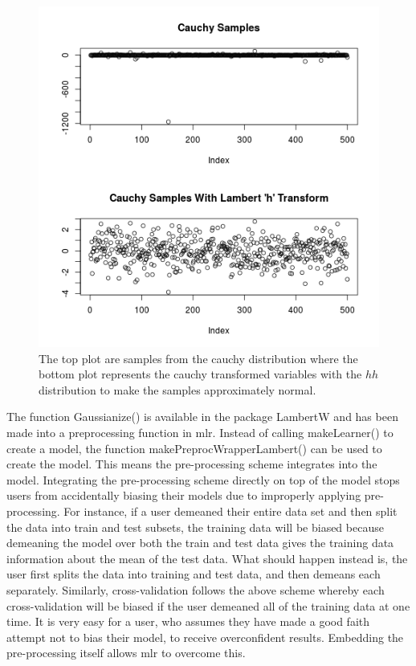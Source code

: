 \documentclass[12pt]{article}\usepackage[]{graphicx}\usepackage[]{color}
\makeatletter
\theoremstyle{definition}
\newcommand\code{\@codex}
\def\@codex#1{{\normalfont\ttfamily\hyphenchar\font=-1 #1}}
\newcommand{\pkg}[1]{{\fontseries{b}\selectfont #1}}
\makeatother
\begin{document}
\begin{figure}[H]
\includegraphics[width=\linewidth]{cauchy_h_train.png}
\centering
\caption{The top plot are samples from the cauchy distribution where the bottom plot represents the cauchy transformed variables with the $hh$ distribution to make the samples approximately normal.}
\label{fig:cauchy_lambert}
\end{figure}

\doublespacing

The function \code{Gaussianize()} is available in the package \pkg{LambertW} and has been made into a preprocessing function in \pkg{mlr}. Instead of calling \code{makeLearner()} to create a model, the function \code{makePreprocWrapperLambert()} can be used to create the model. This means the pre-processing scheme integrates into the model. Integrating the pre-processing scheme directly on top of the model stops users from accidentally biasing their models due to improperly applying pre-processing. For instance, if a user demeaned their entire data set and then split the data into train and test subsets, the training data will be biased because demeaning the model over both the train and test data gives the training data information about the mean of the test data. What should happen instead is, the user first splits the data into training and test data, and then demeans each separately. Similarly, cross-validation follows the above scheme whereby each cross-validation will be biased if the user demeaned all of the training data at one time. It is very easy for a user, who assumes they have made a good faith attempt not to bias their model, to receive overconfident results. Embedding the pre-processing itself allows \pkg{mlr} to overcome this.
\end{document}

